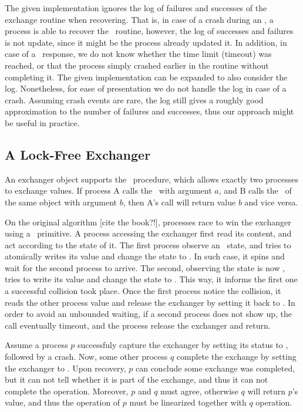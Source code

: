 The given implementation ignores the log of failures and successes of the exchange routine when recovering. That is, in case of a crash during an \exchange, a process is able to recover the \exchange\ routine, however, the log of successes and failures is not update, since it might be the process already updated it. In addition, in case of a \fail\ response, we do not know whether the time limit (timeout) was reached, or that the process simply crashed earlier in the routine without completing it. The given implementation can be expanded to also consider the log. Nonetheless, for ease of presentation we do not handle the log in case of a crash. Assuming crash events are rare, the log still gives a roughly good approximation to the number of failures and successes, thus our approach might be useful in practice.

\subsection{A Lock-Free Exchanger}
An exchanger object supports the \exchange\ procedure, which allows exactly two processes to exchange values. 
If process A calls the \exchange\ with argument $a$, and B calls the \exchange\ of the same object with argument $b$, then A's call will return value $b$ and vice versa.

On the original algorithm [cite the book?!], processes race to win the exchanger using a \CAS\ primitive. A process accessing the exchanger first read its content, and act according to the state of it. The first process observe an \emptyst\ state, and tries to atomically writes its value and change the state to \waiting. In such case, it spins and wait for the second process to arrive. The second, observing the state is now \waiting, tries to write its value and change the state to \busy. This way, it informs the first one a successful collision took place. Once the first process notice the collision, it reads the other process value and release the exchanger by setting it back to \emptyst.
In order to avoid an unbounded waiting, if a second process does not show up, the call eventually timeout, and the process release the exchanger and return.

Assume a process $p$ successfuly capture the exchanger by setting its status to \waiting, followed by a crash. Now, some other process $q$ complete the exchange by setting the exchanger to \busy. Upon recovery, $p$ can conclude some exchange was completed, but it can not tell whether it is part of the exchange, and thus it can not complete the operation. Moreover, $p$ and $q$ must agree, otherwise $q$ will return $p$'s value, and thus the operation of $p$ must be linearized together with $q$ operation.




